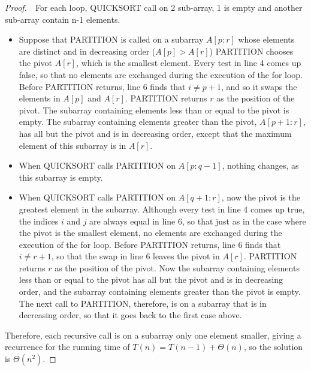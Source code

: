 \documentclass{article}
\begin{document}
\begin{proof}
    $ $\newline
    $ $\newline
    For each loop, QUICKSORT call on 2 sub-array, 1 is empty and another sub-array contain n-1 elements.
    
    \begin{itemize}
    \item 
        Suppose that PARTITION is called on a subarray $A[p:r]$ 
        whose elements are distinct and in decreasing order ($A[p] > A[r]$)
        PARTITION chooses the pivot $A[r]$, which is the smallest element.
        Every test in line 4 comes up false, so that no elements are exchanged during the execution of the for loop. 
        Before PARTITION returns, line 6 finds that $i \neq p + 1$, 
        and so it swaps the elements in $A[p]$ and $A[r]$. 
        PARTITION returns $r$ as the position of the pivot. 
        The subarray containing elements less than or equal to the pivot is empty. 
        The subarray containing elements greater than the pivot, $A[p+1:r]$, 
        has all but the pivot and is in decreasing order, 
        except that the maximum element of this subarray is in $A[r]$.
    
    \item 
        When QUICKSORT calls PARTITION on $A[p:q-1]$, nothing changes, 
        as this subarray is empty. 
    \item 
        When QUICKSORT calls PARTITION on $A[q+1:r]$, now the pivot is the greatest element in the subarray. 
        Although every test in line 4 comes up true, the indices $i$ and $j$ are always equal in line 6, 
        so that just as in the case where the pivot is the smallest element, 
        no elements are exchanged during the execution of the for loop. 
        Before PARTITION returns, line 6 finds that $i \neq r + 1$, 
        so that the swap in line 6 leaves the pivot in $A[r]$. 
        PARTITION returns $r$ as the position of the pivot. 
        Now the subarray containing elements less than or equal to the pivot has all but the pivot and is in decreasing order, 
        and the subarray containing elements greater than the pivot is empty. 
        The next call to PARTITION, therefore, is on a subarray that is in decreasing order, 
        so that it goes back to the first case above.
    
    \end{itemize}
    Therefore, each recursive call is on a subarray only one element smaller, 
    giving a recurrence for the running time of $T(n) = T(n-1) + \Theta(n)$, 
    so the solution is $\Theta(n^2)$.
\end{proof}
\end{document}
